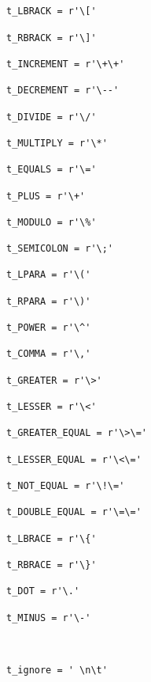\documentclass[11pt,a4paper]{report}
\begin{document}
    \begin{lstlisting}
        

t_LBRACK = r'\['

t_RBRACK = r'\]'

t_INCREMENT = r'\+\+'

t_DECREMENT = r'\--'

t_DIVIDE = r'\/'

t_MULTIPLY = r'\*'

t_EQUALS = r'\='

t_PLUS = r'\+'

t_MODULO = r'\%'

t_SEMICOLON = r'\;'

t_LPARA = r'\('

t_RPARA = r'\)'

t_POWER = r'\^'

t_COMMA = r'\,'

t_GREATER = r'\>'

t_LESSER = r'\<'

t_GREATER_EQUAL = r'\>\='

t_LESSER_EQUAL = r'\<\='

t_NOT_EQUAL = r'\!\='

t_DOUBLE_EQUAL = r'\=\='

t_LBRACE = r'\{'

t_RBRACE = r'\}'

t_DOT = r'\.'

t_MINUS = r'\-'



t_ignore = ' \n\t'
    \end{lstlisting}
\end{document}
